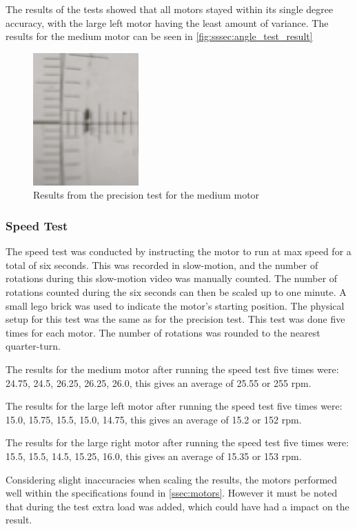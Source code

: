 The results of the tests showed that all motors stayed within its single degree accuracy, with the large left motor having the least amount of variance. The results for the medium motor can be seen in \autoref{fig:sssec:angle_test_result}

\begin{figure}[H]
    \centering
    \includegraphics[scale = 0.8]{images/techAnalysis/MediumMotorAngleResult.jpg}
    \caption{Results from the precision test for the medium motor}\label{fig:sssec:angle_test_result}
\end{figure}

\subsubsection{Speed Test}
The speed test was conducted by instructing the motor to run at max speed for a total of six seconds.
This was recorded in slow-motion, and the number of rotations during this slow-motion video was manually counted.
The number of rotations counted during the six seconds can then be scaled up to one minute. 
A small lego brick was used to indicate the motor's starting position.
The physical setup for this test was the same as for the precision test.
This test was done five times for each motor.
The number of rotations was rounded to the nearest quarter-turn.

The results for the medium motor after running the speed test five times were:
24.75, 24.5, 26.25, 26.25, 26.0, this gives an average of 25.55 or 255 rpm.

The results for the large left motor after running the speed test five times were:
15.0, 15.75, 15.5, 15.0, 14.75, this gives an average of 15.2 or 152 rpm.

The results for the large right motor after running the speed test five times were:
15.5, 15.5, 14.5, 15.25, 16.0, this gives an average of 15.35 or 153 rpm.

Considering slight inaccuracies when scaling the results, the motors performed well within the specifications found in \autoref{ssec:motors}.
However it must be noted that during the test extra load was added, which could have had a impact on the result.

